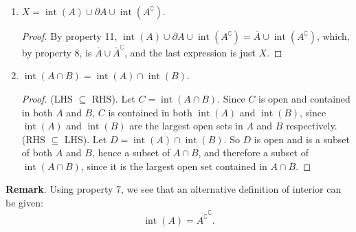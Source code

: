 \documentclass[12pt]{article}
\def\int{\operatorname{int}}
\begin{document}
\begin{enumerate}
\begin{proof}
\begin{alignat*}{2}
\end{alignat*}
\end{proof}
\item $X=\int(A)\cup \partial A \cup \int(A^\complement)$.
\begin{proof}  By property 11, $\int(A)\cup \partial A \cup \int(A^\complement) = \overline{A} \cup \int(A^\complement)$, which, by property 8, is $\overline{A} \cup \overline{A}^\complement$, and the last expression is just $X$.
\end{proof}
\item $\int(A\cap B)=\int(A)\cap \int(B)$.
\begin{proof}  (LHS $\subseteq$ RHS).  Let $C=\int(A\cap B)$.  Since $C$ is open and contained in both $A$ and $B$, $C$ is contained in both $\int(A)$ and $\int(B)$, since $\int(A)$ and $\int(B)$ are the largest open sets in $A$ and $B$ respectively.  (RHS $\subseteq$ LHS).  Let $D=\int(A)\cap \int(B)$.  So $D$ is open and is a subset of both $A$ and $B$, hence a subset of $A\cap B$, and therefore a subset of $\int(A\cap B)$, since it is the largest open set contained in $A\cap B$.
\end{proof}
\end{enumerate}

\textbf{Remark}.  Using property 7, we see that an alternative definition of interior can be given: $$\int(A)=\overline{A^\complement}^\complement.$$
\end{document}
